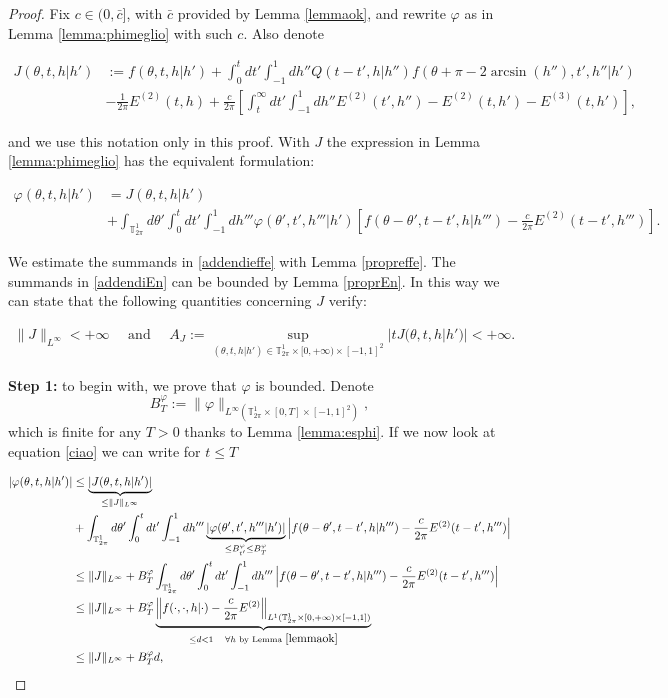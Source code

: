 \documentclass[a4paper,10pt,reqno]{amsart}
\numberwithin{equation}{subsection}
\numberwithin{figure}{subsection}
\begin{document}
\begin{proof} Fix $c\in(0,\bar c]$, with $\bar c$ provided by Lemma \ref{lemmaok}, and rewrite $\varphi$ as in Lemma \ref{lemma:phimeglio} with such $c$. Also denote

{\footnotesize\begin{align}
\label{addendieffe}J(\theta,t,h|h')&:=f(\theta,t,h|h')+\int_0^tdt'\int_{-1}^1dh''Q(t-t',h|h'')f(\theta+\pi-2\arcsin(h''),t',h''|h')
\\
\label{addendiEn}&-\frac{1}{2\pi}E^{(2)}(t,h)+\frac{c}{2\pi}\left[\int_t^{\infty}dt'\int_{-1}^1dh''E^{(2)}(t',h'')-E^{(2)}(t,h')-E^{(3)}(t,h')\right],
\end{align}}

and we use this notation only in this proof. With $J$ the expression in Lemma \ref{lemma:phimeglio} has the equivalent formulation:

{\scriptsize\begin{align}
\nonumber\varphi(\theta,t,h|h')&=J(\theta,t,h|h')
\\
\label{ciao}&+\int_{\mathbb{T}^1_{2\pi}}d\theta'\int_0^tdt'\int_{-1}^1dh'''\varphi(\theta',t',h'''|h')\left[f(\theta-\theta',t-t',h|h''')-\frac{c}{2\pi}E^{(2)}(t-t',h''')\right].
\end{align}}

We estimate the summands in \eqref{addendieffe} with Lemma \ref{propreffe}. The summands in \eqref{addendiEn} can be bounded by Lemma \ref{proprEn}. In this way we can state that the following quantities concerning $J$ verify:

\begin{align*}
\|J\|_{L^{\infty}}<+\infty\quad\textrm{ and }\quad A_J:=\sup_{(\theta,t,h|h')\in\mathbb{T}^1_{2\pi}\times[0,+\infty)\times[-1,1]^2}|tJ(\theta,t,h|h')|<+\infty.
\end{align*}

\textbf{Step 1:} to begin with, we prove that $\varphi$ is bounded. Denote
\[
B_T^{\varphi}:=\|\varphi\|_{L^{\infty}(\mathbb{T}^1_{2\pi}\times[0,T]\times[-1,1]^2)},
\]
which is finite for any $T>0$ thanks to Lemma \ref{lemma:esphi}. If we now look at equation \eqref{ciao} we can write for $t\leq T$

{\scriptsize\begin{align*}
|\varphi(\theta,t,h|h')|&\leq\underbrace{|J(\theta,t,h|h')|}_{\leq\|J\|_{L^{\infty}}}
\\
&+\int_{\mathbb{T}^1_{2\pi}}d\theta'\int_0^tdt'\int_{-1}^1dh'''\underbrace{|\varphi(\theta',t',h'''|h')|}_{\leq B_{t'}^{\varphi}\leq B_T^{\varphi}}\left|f(\theta-\theta',t-t',h|h''')-\frac{c}{2\pi}E^{(2)}(t-t',h''')\right|
\\
&\leq\|J\|_{L^{\infty}}+B_T^{\varphi}\int_{\mathbb{T}^1_{2\pi}}d\theta'\int_0^tdt'\int_{-1}^1dh'''\left|f(\theta-\theta',t-t',h|h''')-\frac{c}{2\pi}E^{(2)}(t-t',h''')\right|
\\
&\leq\|J\|_{L^{\infty}}+B_T^{\varphi}\underbrace{\left\|f(\cdot,\cdot,h|\cdot)-\frac{c}{2\pi}E^{(2)}\right\|_{L^1(\mathbb{T}^1_{2\pi}\times[0,+\infty)\times[-1,1])}}_{\leq d<1\quad\forall h\textrm{ by Lemma }\ref{lemmaok}}
\\
&\leq\|J\|_{L^{\infty}}+B_T^{\varphi}d,
\end{align*}}


\end{proof}
\end{document}
